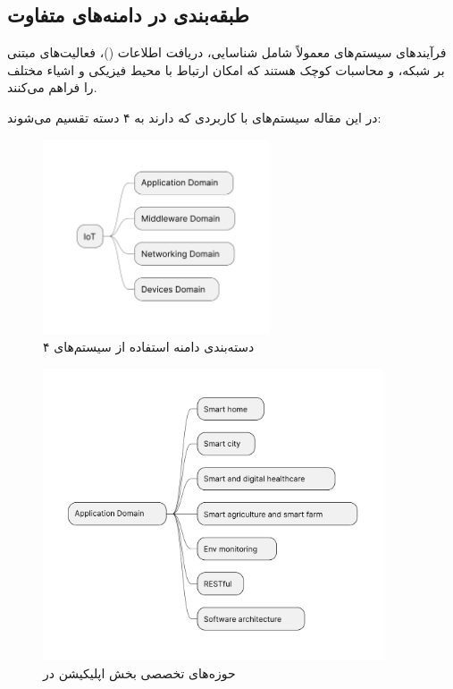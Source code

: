 \subsection{طبقه‌بندی  در دامنه‌های متفاوت}

فرآیندهای سیستم‌های  معمولاً شامل شناسایی، دریافت اطلاعات
()، فعالیت‌های مبتنی بر شبکه، و محاسبات کوچک هستند که امکان ارتباط
با محیط فیزیکی و اشیاء مختلف را فراهم می‌کنند.

در این مقاله سیستم‌های  با کاربردی که دارند به ۴ دسته تقسیم می‌شوند:

\begin{figure}[H]
  \centering
  \includegraphics[width=0.6\textwidth]{./figures/IoT_overall_domains.pdf}
  \caption{۴ دسته‌بندی دامنه استفاده از سیستم‌های }
  \label{fig:iotOverallDomains}
\end{figure}

\begin{figure}[H]
  \centering
  \includegraphics[width=0.9\textwidth]{./figures/IoT_application_domains.pdf}
  \caption{حوزه‌های تخصصی بخش اپلیکیشن در }
  \label{fig:iotApplicationDomains}
\end{figure}

